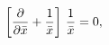 \begin{equation}
\left[   {\partial \over \partial \bar x} +{1\over \bar x} \right]
\, {1\over \bar x} = 0,
\end{equation}

